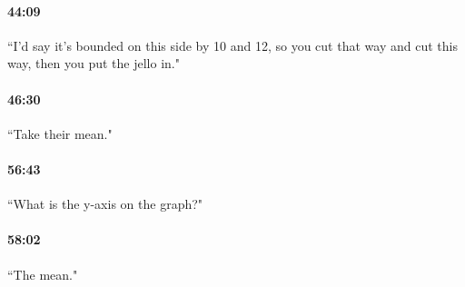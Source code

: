 \documentclass[11pt]{article}
\begin{document}
\paragraph{44:09} ``I'd say it's bounded on this side by 10 and 12, so you cut that way and cut this way, then you put the jello in."
\paragraph{46:30} ``Take their mean."
\paragraph{56:43} ``What is the y-axis on the graph?"
\paragraph{58:02}  ``The mean."
\end{document}

